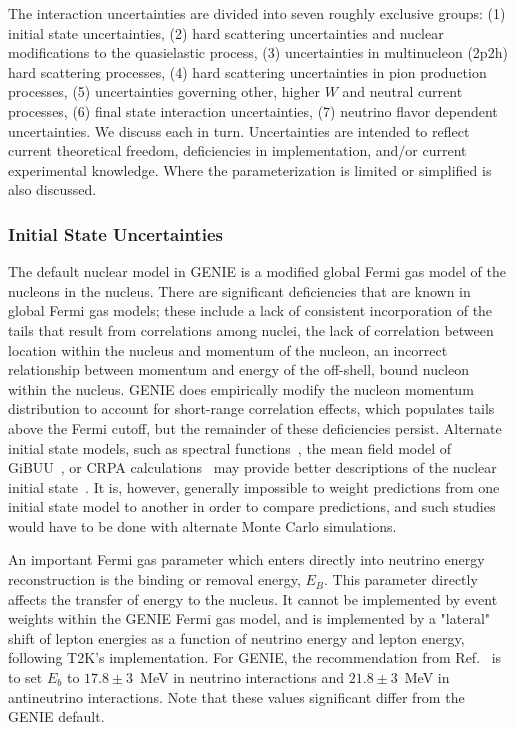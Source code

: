 The interaction uncertainties are divided into seven roughly exclusive groups: (1) initial state uncertainties, (2) hard scattering uncertainties and nuclear modifications to the quasielastic process, (3) uncertainties in multinucleon (2p2h) hard scattering processes, (4) hard scattering uncertainties in pion production processes, (5) uncertainties governing other, higher $W$ and neutral current processes, (6) final state interaction uncertainties, (7) neutrino flavor dependent uncertainties.  We discuss each in turn.  Uncertainties are intended to reflect current theoretical freedom, deficiencies in implementation, and/or current experimental knowledge. Where the parameterization is limited or simplified is also discussed. 

\subsubsection{Initial State Uncertainties}
The default nuclear model in GENIE is a modified global Fermi gas model of the nucleons in the nucleus.  There are significant deficiencies that are known in global Fermi gas models; these include a lack of consistent incorporation of the tails that result from correlations among nuclei, the lack of correlation between location within the nucleus and momentum of the nucleon, an incorrect relationship between momentum and energy of the off-shell, bound nucleon within the nucleus. GENIE does empirically modify the nucleon momentum distribution to account for short-range correlation effects, which populates tails above the Fermi cutoff, but the remainder of these deficiencies persist.   Alternate initial state models, such as spectral functions~\cite{Benhar:1994hw,Nieves:2004wx}, the mean field model of GiBUU~\cite{Gallmeister:2016dnq}, or CRPA calculations~\cite{Pandey:2014tza} may provide better descriptions of the nuclear initial state~\cite{Sobczyk:2017mts}.  It is, however, generally impossible to weight predictions from one initial state model to another in order to compare predictions, and such studies would have to be done with alternate Monte Carlo simulations.

An important Fermi gas parameter which enters directly into neutrino energy reconstruction is the binding or removal energy, $E_B$.  This parameter directly affects the transfer of energy to the nucleus.  It cannot be implemented by event weights within the GENIE Fermi gas model, and is implemented by a "lateral" shift of lepton energies as a function of neutrino energy and lepton energy, following T2K's implementation. For GENIE, the recommendation from Ref.~\cite{bodek_eb} is to set $E_b$ to $17.8\pm 3$~MeV in neutrino interactions and $21.8\pm 3$~MeV in antineutrino interactions.  Note that these values significant differ from the GENIE default.



